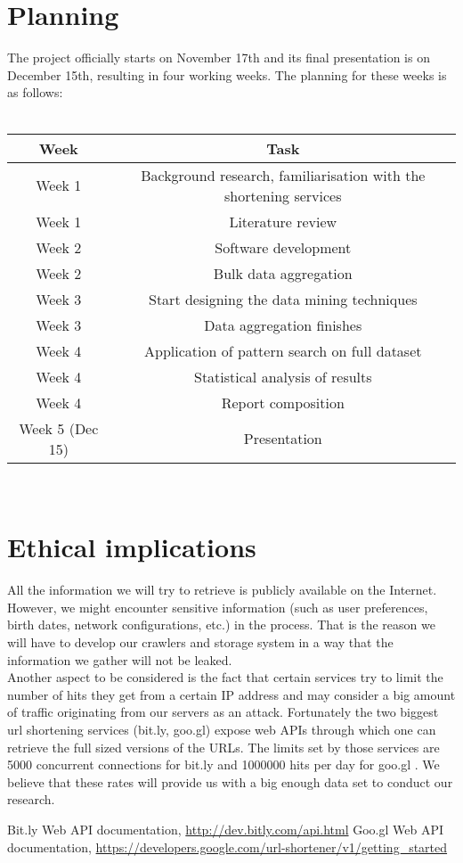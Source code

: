\documentclass{article}
\begin{document}
\section{Planning}
The project officially starts on November 17th and its final presentation is on December 15th, resulting in four working weeks. The planning for these weeks is as follows:
\\\\
\begin{table}[h]
  \begin{tabular}{|c|c|}
    \hline
    Week  & Task \\
    \hline
    Week 1 & Background research, familiarisation with the shortening services \\
    \hline
    Week 1 & Literature review   \\
    \hline
    Week 2 & Software development \\
    \hline
    Week 2  & Bulk data aggregation \\
    \hline
    Week 3 & Start designing the data mining techniques\\
    \hline
    Week 3 & Data aggregation finishes\\
    \hline
    Week 4 & Application of pattern search on full dataset \\
    \hline
    Week 4  & Statistical analysis of results \\
    \hline
    Week 4  & Report composition  \\
    \hline
    Week 5 (Dec 15) & Presentation \\
    \hline
  \end{tabular}
\end{table}\\

\section{Ethical implications}
All the information we will try to retrieve is publicly available on the Internet. However, we might encounter sensitive information (such as user preferences, birth dates, network configurations, etc.) in the process. That is the reason we will have to develop our crawlers and storage system in a way that the information we gather will not be leaked.\\
Another aspect to be considered is the fact that certain services try to limit the number of hits they get from a certain IP address and may consider a big amount of traffic originating from our servers as an attack. Fortunately the two biggest url shortening services (bit.ly, goo.gl) expose web APIs through which one can retrieve the full sized versions of the URLs. The limits set by those services are 5000 concurrent \cite{bitlyapi} connections for bit.ly and 1000000 hits per day for goo.gl \cite{googleapi}. We believe that these rates will provide us with a big enough data set to conduct our research. 

\begin{thebibliography}{9}

Bit.ly Web API documentation, \url{http://dev.bitly.com/api.html}
Goo.gl Web API documentation, \url{https://developers.google.com/url-shortener/v1/getting_started}

\end{thebibliography}
\end{document}
